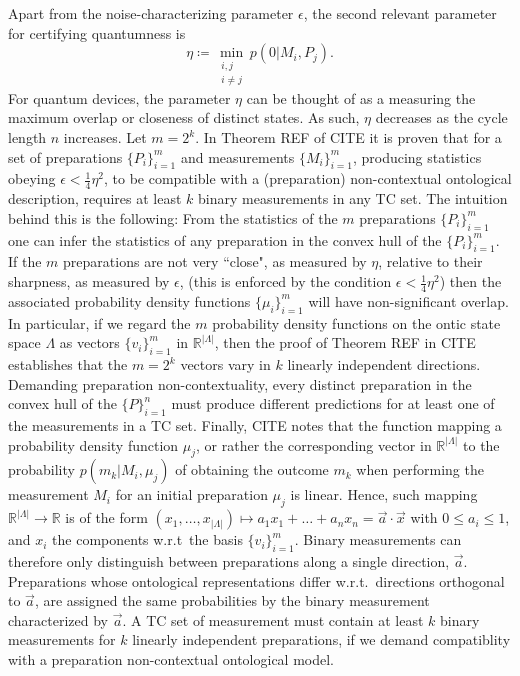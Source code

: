 Apart from the noise-characterizing parameter $\epsilon$, the second relevant parameter for certifying quantumness is
\begin{equation}
\eta\coloneqq \min_{\substack{i,j \\ i\neq j}} p(0\vert M_i, P_j).
\end{equation}
For quantum devices, the parameter $\eta$ can be thought of as a measuring the maximum overlap or closeness of distinct states. As such, $\eta$ decreases as the cycle length $n$ increases. Let $m=2^k$. In Theorem REF of CITE it is proven that for a set of preparations $\{P_i\}_{i=1}^m$ and measurements $\{M_i\}_{i=1}^m$, producing statistics obeying $\epsilon<\frac{1}{4}\eta^2$, to be compatible with a (preparation) non-contextual ontological description, requires at least $k$ binary measurements in any TC set. The intuition behind this is the following: From the statistics of the $m$ preparations $\{P_i\}_{i=1}^m$ one can infer the statistics of any preparation in the convex hull of the $\{P_i\}_{i=1}^m$. If the $m$ preparations are not very ``close", as measured by $\eta$, relative to their sharpness, as measured by $\epsilon$, (this is enforced by the condition $\epsilon<\frac{1}{4}\eta^2$) then the associated probability density functions $\{\mu_i\}_{i=1}^m$ will have non-significant overlap. In particular, if we regard the $m$ probability density functions on the ontic state space $\Lambda$ as vectors $\{v_i\}_{i=1}^m$ in $\mathbb{R}^{\vert \Lambda \vert}$, then the proof of Theorem REF in CITE establishes that the $m=2^k$ vectors vary in $k$ linearly independent directions. Demanding preparation non-contextuality, every distinct preparation in the convex hull of the $\{P\}_{i=1}^n$ must produce different predictions for at least one of the measurements in a TC set. Finally, CITE notes that the function mapping a probability density function $\mu_j$, or rather the corresponding vector in $\mathbb{R}^{\vert \Lambda \vert}$ to the probability $p(m_k\vert M_i,\mu_j)$ of obtaining the outcome $m_k$ when performing the measurement $M_i$ for an initial preparation $\mu_j$ is linear. Hence, such mapping $\mathbb{R}^{\vert \Lambda \vert}\rightarrow\mathbb{R}$ is of the form $(x_1,\dots,x_{\vert \Lambda \vert})\mapsto a_1 x_1+\dots + a_n x_n = \vec{a}\cdot \vec{x}$ with $0 \leq a_i \leq 1$, and $x_i$ the components w.r.t\ the basis $\{v_i\}_{i=1}^m$. Binary measurements can therefore only distinguish between preparations along a single direction, $\vec{a}$. Preparations whose ontological representations differ w.r.t.\ directions orthogonal to $\vec{a}$, are assigned the same probabilities by the binary measurement characterized by $\vec{a}$. A TC set of measurement must contain at least $k$ binary measurements for $k$ linearly independent preparations, if we demand compatiblity with a preparation non-contextual ontological model.

